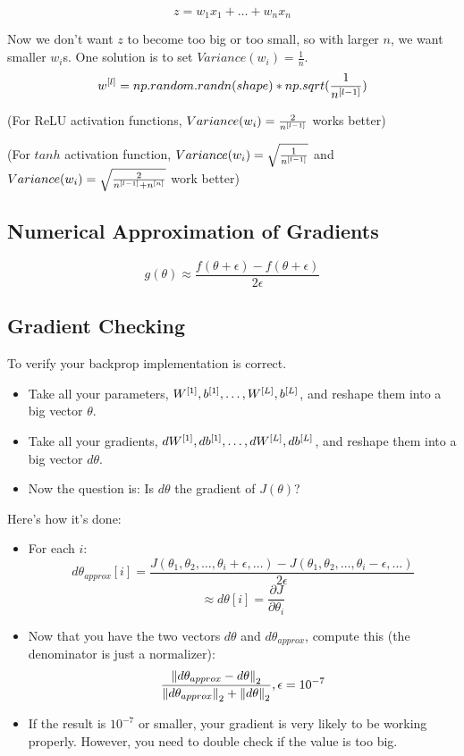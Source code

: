 $$
z = w_1 x_1 + \dots + w_n x_n
$$

Now we don't want $z$ to become too big or too small, so with larger $n$, we want smaller $w_i$s. One solution is to set $Variance(w_i)=\frac{1}{n}$.
$$
w^{[l]} = np.random.randn(shape) \ast np.sqrt(\frac{1}{n^{[l-1]}})
$$

(For ReLU activation functions, $Variance(w_i)=\frac{2}{n^{[l-1]}}$ works better)

(For $tanh$ activation function, $Variance(w_i)=\sqrt{\frac{1}{n^{[l-1]}}}$ and $Variance(w_i)=\sqrt{\frac{2}{n^{[l-1]}+n^{[n]}}}$ work better)

\subsection{Numerical Approximation of Gradients}
$$
g(\theta) \approx \frac{f(\theta + \epsilon) - f(\theta + \epsilon)}{2\epsilon}
$$

\subsection{Gradient Checking}
To verify your backprop implementation is correct. 
\begin{itemize}
    \item Take all your parameters, $W^{[1]}, b^{[1]}, \dots, W^{[L]}, b^{[L]}$, and reshape them into a big vector $\theta$. 
    \item Take all your gradients, $dW^{[1]}, db^{[1]}, \dots, dW^{[L]}, db^{[L]}$, and reshape them into a big vector $d\theta$. 
    \item Now the question is: Is $d\theta$ the gradient of $J(\theta)$?
\end{itemize}

Here's how it's done: 
\begin{itemize}
    \item For each $i$: 
    $$d\theta_{approx}[i]=\frac{J(\theta_1, \theta_2, \dots, \theta_i+\epsilon, \dots) - J(\theta_1, \theta_2, \dots, \theta_i-\epsilon, \dots)}{2\epsilon}$$ 
    $$\approx d\theta[i] = \frac{\partial J}{\partial \theta_i}$$
    \item Now that you have the two vectors $d\theta$ and $d\theta_{approx}$, compute this (the denominator is just a normalizer): 
    $$
    \frac{\left\lVert d\theta_{approx} - d\theta\right\rVert_2}{\left\lVert d\theta_{approx}\right\rVert_2 + \left\lVert d\theta\right\rVert_2}, \epsilon = 10^{-7}
    $$
    \item If the result is $10^{-7}$ or smaller, your gradient is very likely to be working properly. However, you need to double check if the value is too big. 
\end{itemize}